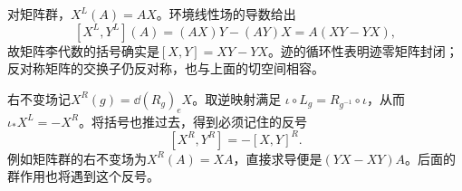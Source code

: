 对矩阵群，$X^L(A)=AX$。环境线性场的导数给出
\[
 [X^L,Y^L](A)=(AX)Y-(AY)X=A(XY-YX),
\]
故矩阵李代数的括号确实是$[X,Y]=XY-YX$。迹的循环性表明迹零矩阵封闭；反对称矩阵的交换子仍反对称，也与上面的切空间相容。

右不变场记$X^R(g)=\dd(R_g)_eX$。取逆映射满足
$\iota\circ L_g=R_{g^{-1}}\circ\iota$，从而$\iota_*X^L=-X^R$。将括号也推过去，得到必须记住的反号
\begin{equation}\label{eq:lie-right-sign}
 [X^R,Y^R]=-[X,Y]^R.
\end{equation}
例如矩阵群的右不变场为$X^R(A)=XA$，直接求导便是$(YX-XY)A$。后面的群作用也将遇到这个反号。
